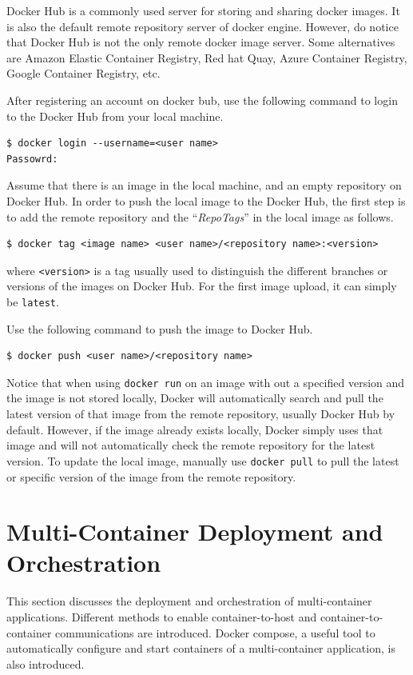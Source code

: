 Docker Hub is a commonly used server for storing and sharing docker images. It is also the default remote repository server of docker engine. However, do notice that Docker Hub is not the only remote docker image server. Some alternatives are Amazon Elastic Container Registry, Red hat Quay, Azure Container Registry, Google Container Registry, etc.

After registering an account on docker bub, use the following command to login to the Docker Hub from your local machine.
\begin{lstlisting}
$ docker login --username=<user name>
Passowrd:
\end{lstlisting}

Assume that there is an image in the local machine, and an empty repository on Docker Hub. In order to push the local image to the Docker Hub, the first step is to add the remote repository and the ``\textit{RepoTags}'' in the local image as follows.
\begin{lstlisting}
$ docker tag <image name> <user name>/<repository name>:<version>
\end{lstlisting}
where \verb|<version>| is a tag usually used to distinguish the different branches or versions of the images on Docker Hub. For the first image upload, it can simply be \verb|latest|.

Use the following command to push the image to Docker Hub.
\begin{lstlisting}
$ docker push <user name>/<repository name>
\end{lstlisting}

Notice that when using \verb|docker run| on an image with out a specified version and the image is not stored locally, Docker will automatically search and pull the latest version of that image from the remote repository, usually Docker Hub by default. However, if the image already exists locally, Docker simply uses that image and will not automatically check the remote repository for the latest version. To update the local image, manually use \verb|docker pull| to pull the latest or specific version of the image from the remote repository.

\section{Multi-Container Deployment and Orchestration}

This section discusses the deployment and orchestration of multi-container applications. Different methods to enable container-to-host and container-to-container communications are introduced. Docker compose, a useful tool to automatically configure and start containers of a multi-container application, is also introduced.

